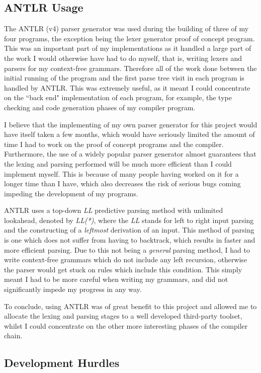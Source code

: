 \documentclass[a4paper, 11pt]{article}
\begin{document}
\subsection{ANTLR Usage}
The ANTLR\cite{ANTLR} (v4) parser generator was used during the building of three of my four programs, the exception being the lexer generator proof of concept program. This was an important part of my implementations as it handled a large part of the work I would otherwise have had to do myself, that is, writing lexers and parsers for my context-free grammars. Therefore all of the work done between the initial running of the program and the first parse tree visit in each program is handled by ANTLR. This was extremely useful, as it meant I could concentrate on the ``back end" implementation of each program, for example, the type checking and code generation phases of my compiler program. 

I believe that the implementing of my own parser generator for this project would have itself taken a few months, which would have seriously limited the amount of time I had to work on the proof of concept programs and the compiler. Furthermore, the use of a widely popular parser generator almost guarantees that the lexing and parsing performed will be much more efficient than I could implement myself. This is because of many people having worked on it for a longer time than I have, which also decreases the risk of serious bugs coming impeding the development of my programs.

ANTLR uses a top-down \textit{LL} predictive parsing method with unlimited lookahead, denoted by \textit{LL(*)}, where the \textit{LL} stands for left to right input parsing and the constructing of a \textit{leftmost} derivation of an input. This method of parsing is one which does not suffer from having to backtrack, which results in faster and more efficient parsing. Due to this not being a \textit{general} parsing method, I had to write context-free grammars which do not include any left recursion, otherwise the parser would get stuck on rules which include this condition. This simply meant I had to be more careful when writing my grammars, and did not significantly impede my progress in any way. 

To conclude, using ANTLR was of great benefit to this project and allowed me to allocate the lexing and parsing stages to a well developed third-party toolset, whilst I could concentrate on the other more interesting phases of the compiler chain.

\subsection{Development Hurdles}
\end{document}
